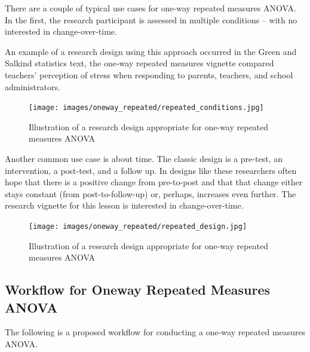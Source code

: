 \documentclass[
  11pt,
]{book}
\begin{document}
There are a couple of typical use cases for one-way repeated measures ANOVA. In the first, the research participant is assessed in multiple conditions -- with no interested in change-over-time.

An example of a research design using this approach occurred in the Green and Salkind \citeyearpar{green_one-way_2017-1} statistics text, the one-way repeated measures vignette compared teachers' perception of stress when responding to parents, teachers, and school administrators.

\begin{figure}
\centering
\texttt{[image: images/oneway\_repeated/repeated\_conditions.jpg]}
\caption{Illustration of a research design appropriate for one-way repeated measures ANOVA}
\end{figure}

Another common use case is about time. The classic design is a pre-test, an intervention, a post-test, and a follow up. In designs like these researchers often hope that there is a positive change from pre-to-post and that that change either stays constant (from post-to-follow-up) or, perhaps, increases even further. The research vignette for this lesson is interested in change-over-time.

\begin{figure}
\centering
\texttt{[image: images/oneway\_repeated/repeated\_design.jpg]}
\caption{Illustration of a research design appropriate for one-way repeated measures ANOVA}
\end{figure}

\hypertarget{workflow-for-oneway-repeated-measures-anova}{%
\subsection{Workflow for Oneway Repeated Measures ANOVA}\label{workflow-for-oneway-repeated-measures-anova}}

The following is a proposed workflow for conducting a one-way repeated measures ANOVA.
\end{document}
